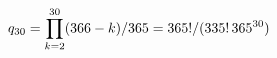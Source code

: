 \documentclass[preview]{standalone}
\begin{document}
\begin{align*}
\special{dvisvgm:raw <g id='unique000'>}q_{30}=\prod_{k=2}^{30}(366-k)/365=365!/(335!\,365^{30})\special{dvisvgm:raw </g>}
\end{align*}
\end{document}
